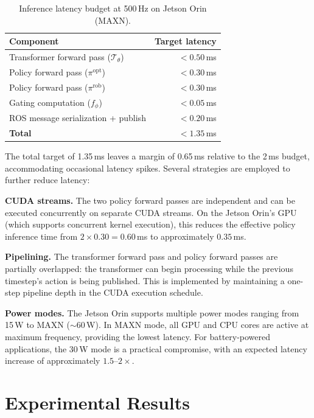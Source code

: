 \documentclass[conference]{IEEEtran}
\newcommand{\cT}{\mathcal{T}}
\newcommand{\piopt}{\pi^{\text{opt}}}
\newcommand{\pirob}{\pi^{\text{rob}}}
\begin{document}
\begin{table}[t]
\centering
\caption{Inference latency budget at 500\,Hz on Jetson Orin (MAXN).}
\label{tab:latency}
\small
\begin{tabular}{@{}lr@{}}
\toprule
\textbf{Component} & \textbf{Target latency} \\
\midrule
Transformer forward pass ($\cT_\theta$)
  & $< 0.50$\,ms \\
Policy forward pass ($\piopt$)
  & $< 0.30$\,ms \\
Policy forward pass ($\pirob$)
  & $< 0.30$\,ms \\
Gating computation ($f_\phi$)
  & $< 0.05$\,ms \\
ROS message serialization + publish
  & $< 0.20$\,ms \\
\midrule
\textbf{Total}
  & $< 1.35$\,ms \\
\bottomrule
\end{tabular}
\vspace{-0.1cm}
\end{table}

The total target of 1.35\,ms leaves a margin of 0.65\,ms relative to
the 2\,ms budget, accommodating occasional latency spikes.  Several
strategies are employed to further reduce latency:

\textbf{CUDA streams.}  The two policy forward passes are independent and
can be executed concurrently on separate CUDA streams.  On the Jetson
Orin's GPU (which supports concurrent kernel execution), this reduces the
effective policy inference time from $2 \times 0.30 = 0.60$\,ms to
approximately $0.35$\,ms.

\textbf{Pipelining.}  The transformer forward pass and policy forward
passes are partially overlapped: the transformer can begin processing
while the previous timestep's action is being published.  This is
implemented by maintaining a one-step pipeline depth in the CUDA
execution schedule.

\textbf{Power modes.}  The Jetson Orin supports multiple power modes
ranging from 15\,W to MAXN ($\sim$60\,W).  In MAXN mode, all GPU and
CPU cores are active at maximum frequency, providing the lowest latency.
For battery-powered applications, the 30\,W mode is a practical compromise,
with an expected latency increase of approximately $1.5$--$2\times$.

\section{Experimental Results}\label{sec:results}
\end{document}
